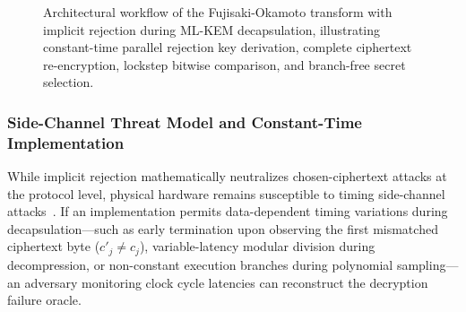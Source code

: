 \begin{figure}[t]
\caption{Architectural workflow of the Fujisaki-Okamoto transform with implicit rejection during \mbox{ML-KEM} decapsulation, illustrating constant-time parallel rejection key derivation, complete ciphertext re-encryption, lockstep bitwise comparison, and branch-free secret selection.}
\label{fig:fo_workflow}
\end{figure}

\subsubsection{Side-Channel Threat Model and Constant-Time Implementation}
While implicit rejection mathematically neutralizes chosen-ciphertext attacks at the protocol level, physical hardware remains susceptible to timing side-channel attacks~\cite{kocher1996}. If an implementation permits data-dependent timing variations during decapsulation---such as early termination upon observing the first mismatched ciphertext byte ($c'_j \neq c_j$), variable-latency modular division during decompression, or non-constant execution branches during polynomial sampling---an adversary monitoring clock cycle latencies can reconstruct the decryption failure oracle.

